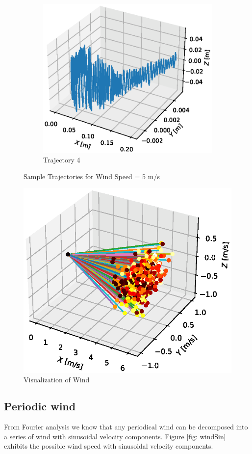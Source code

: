 \begin{figure}[H]
\begin{subfigure}{.5\textwidth}
\includegraphics[width=\linewidth]{Images/trajectory 4.eps}
\caption{Trajectory 4}
\end{subfigure}
\caption{Sample Trajectories for Wind Speed = 5 m/s}
\label{fig: traj}
\end{figure}

\begin{figure}[H]
    \centering
    \includegraphics[width=.8\linewidth]{Images/wind.eps}
    \caption{Visualization of Wind}
    \label{fig: wind}
\end{figure}



\subsection{Periodic wind}
From Fourier analysis we know that any periodical wind can be decomposed into a series of wind with sinusoidal velocity components. Figure \ref{fig: windSin} exhibits the possible wind speed with sinusoidal velocity components.

